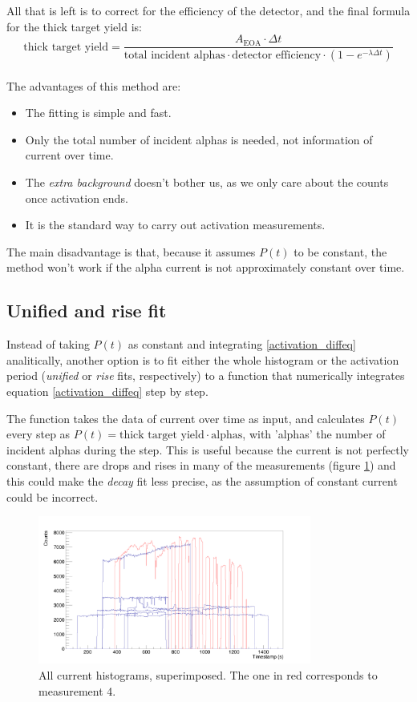 \documentclass[a4paper,12pt]{report}
\begin{document}
All that is left is to correct for the efficiency of the detector, and the final formula for the thick target yield is:
\begin{equation}
	\text{thick target yield} = \frac{A_\text{EOA}\cdot\Delta t}{\text{total incident alphas} \cdot \text{detector efficiency} \cdot \left(1 - e^{-\lambda \Delta t} \right)}	%
\end{equation}
\\

The advantages of this method are:
\begin{itemize}
	\item The fitting is simple and fast.
	\item Only the total number of incident alphas is needed, not information of current over time.
	\item The \textit{extra background} doesn't bother us, as we only care about the counts once activation ends.
	\item It is the standard way to carry out activation measurements.
\end{itemize}
The main disadvantage is that, because it assumes $P(t)$ to be constant, the method won't work if the alpha current is not approximately constant over time.

\subsection{Unified and rise fit}
Instead of taking $P(t)$ as constant and integrating \ref{activation_diffeq} analitically, another option is to fit either the whole histogram or the activation period (\textit{unified} or \textit{rise} fits, respectively) to a function that numerically integrates equation \ref{activation_diffeq} step by step.

The function takes the data of current over time as input, and calculates $P(t)$ every step as $P(t) = \text{thick target yield}\cdot\text{alphas}$, with 'alphas' the number of incident alphas during the step.
This is useful because the current is not perfectly constant, there are drops and rises in many of the measurements (figure \ref{current_histograms}) and this could make the \textit{decay} fit less precise, as the assumption of constant current could be incorrect.
\\
\begin{figure}[H]
	\centering
	\includegraphics[width=0.80\textwidth]{current_histograms.png}
	\caption{All current histograms, superimposed.
	The one in red corresponds to measurement 4.}
	\label{current_histograms}
\end{figure}
\end{document}
